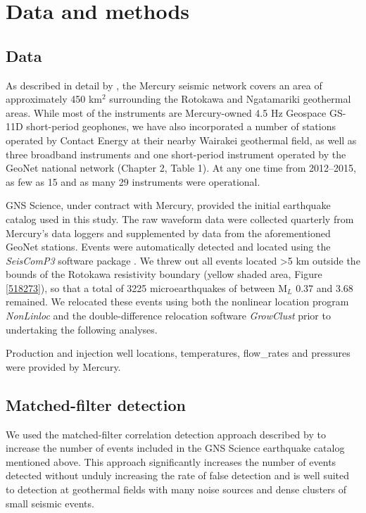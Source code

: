 \section{Data and methods}
\subsection{Data}
As described in detail by \citet[][submitted]{j2019}, the Mercury seismic network covers an area of approximately 450 km$^2$ surrounding the Rotokawa and Ngatamariki geothermal areas. While most of the instruments are Mercury-owned 4.5 Hz Geospace GS-11D short-period geophones, we have also incorporated a number of stations operated by Contact Energy at their nearby Wairakei geothermal field, as well as three broadband instruments and one short-period instrument operated by the GeoNet national network (Chapter 2, Table 1). At any one time from 2012--2015, as few as 15 and as many 29 instruments were operational.

GNS Science, under contract with Mercury, provided the initial earthquake catalog used in this study. The raw waveform data were collected quarterly from Mercury's data loggers and supplemented by data from the aforementioned GeoNet stations. Events were automatically detected and located using the \textit{SeisComP3} software package \citep{Weber2007}. We threw out all events located \textgreater5 km outside the bounds of the Rotokawa resistivity boundary (yellow shaded area, Figure \ref{518273}), so that a total of 3225 microearthquakes of between M$_L$ 0.37 and 3.68 remained. We relocated these events using both the nonlinear location program \textit{NonLinloc} \citep{Lomax_2014} and the double-difference relocation software \textit{GrowClust} \citep{Trugman_2017} prior to undertaking the following analyses.

Production and injection well locations, temperatures, \glspl{flow_rate} and pressures were provided by Mercury.

\subsection{Matched-filter detection}
We used the matched-filter correlation detection approach described by \citet{j2019} to increase the number of events included in the GNS Science earthquake catalog mentioned above. This approach significantly increases the number of events detected without unduly increasing the rate of false detection and is well suited to detection at geothermal fields with many noise sources and dense clusters of small seismic events.

